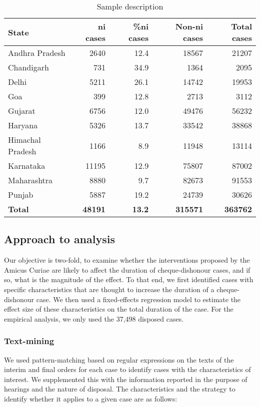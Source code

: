 {\footnotesize \begin{longtable}{@{}lrrrr@{}}
\caption{Sample description}
\label{tab:sample_desc}\\
\toprule
\textbf{State} & \textbf{\gls{ni} cases} & \textbf{\%\gls{ni} cases} & \textbf{Non-\gls{ni} cases} & \textbf{Total cases}\\ \midrule
\endhead
Andhra Pradesh & 2640 & 12.4 & 18567 & 21207\\
Chandigarh & 731 & 34.9 & 1364 & 2095\\
Delhi & 5211 & 26.1 & 14742 & 19953\\
Goa & 399 & 12.8 & 2713 & 3112\\
Gujarat & 6756 & 12.0 & 49476 & 56232\\
Haryana & 5326 & 13.7 & 33542 & 38868\\
Himachal Pradesh & 1166 & 8.9 & 11948 & 13114\\
Karnataka & 11195 & 12.9 & 75807 & 87002\\
Maharashtra & 8880 & 9.7 & 82673 & 91553\\
Punjab & 5887 & 19.2 & 24739 & 30626\\
\textbf{Total} & \textbf{48191} & \textbf{13.2} & \textbf{315571} & \textbf{363762}\\ \bottomrule
\end{longtable}
}

\subsection{Approach to analysis} \label{sec:approach-analysis}

Our objective is two-fold, to examine whether the interventions proposed by the Amicus Curiae are likely to affect the duration of cheque-dishonour cases, and if so, what is the magnitude of the effect. To that end, we first identified cases with specific characteristics that are thought to increase the duration of a cheque-dishonour case. We then used a fixed-effects regression model to estimate the effect size of these characteristics on the total duration of the case. For the empirical analysis, we only used the 37,498 disposed cases.

\subsubsection{Text-mining} \label{sec:text-mining}

We used pattern-matching based on regular expressions on the texts of the interim and final orders for each case to identify cases with the characteristics of interest. We supplemented this with the information reported in the purpose of hearings and the nature of disposal. The characteristics and the strategy to identify whether it applies to a given case are as follows:

